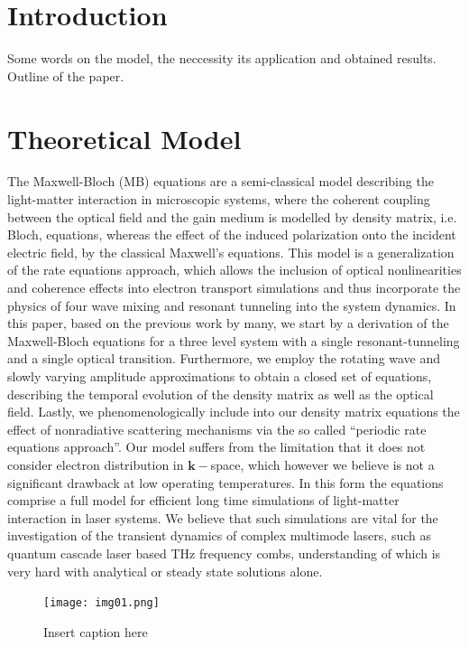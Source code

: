 \documentclass[10pt,letterpaper]{article}
\begin{document}
\section{Introduction}
\label{sec:intro}
Some words on the model, the neccessity its application and obtained results. Outline of the paper.
\section{Theoretical Model}

The Maxwell-Bloch (MB) equations are a semi-classical model describing the light-matter interaction in microscopic systems, where the coherent coupling between the optical field and the gain medium is modelled by density matrix, i.e. Bloch, equations, whereas the effect of the induced polarization onto the incident electric field, by the classical Maxwell's equations. This model is a generalization of the rate equations approach, which allows the inclusion of optical nonlinearities and coherence effects into electron transport simulations and thus incorporate the physics of four wave mixing and resonant tunneling into the system dynamics. In this paper, based on the previous work by many, we start by a derivation of the Maxwell-Bloch equations for a three level system with a single resonant-tunneling  and a single optical transition. Furthermore, we employ the rotating wave and slowly varying amplitude approximations to obtain a closed set of equations, describing the temporal evolution of the density matrix as well as the optical field. Lastly, we phenomenologically include into our density matrix equations the effect of nonradiative scattering mechanisms via the so called ``periodic rate equations approach''. Our model suffers from the limitation that it does not consider electron distribution in $\mathbf{k}-$space, which however we believe is not a significant drawback at low operating temperatures. In this form the equations comprise a full model for efficient long time simulations of light-matter interaction in laser systems. We believe that such simulations are vital for the investigation of the transient dynamics of complex multimode lasers, such as quantum cascade laser based THz frequency combs, understanding of which is very hard with analytical or steady state solutions alone. 
\begin{figure}[h!]
\centering
\texttt{[image: img01.png]}
\caption{Insert caption here} \label{fig:img01}
\end{figure}
\end{document}
